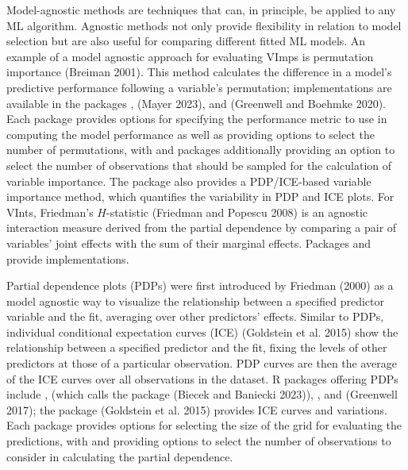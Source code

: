 Model-agnostic methods are techniques that can, in principle, be applied
to any ML algorithm. Agnostic methods not only provide flexibility in
relation to model selection but are also useful for comparing different
fitted ML models. An example of a model agnostic approach for evaluating
VImps is permutation importance (Breiman 2001). This method
calculates the difference in a model's predictive performance following
a variable's permutation; implementations are available in the packages ,  (Mayer 2023),  and  (Greenwell and Boehmke 2020). Each package provides options for specifying the performance metric to use in computing the model performance as well as providing options to select the number of permutations, with  and  packages additionally providing an option to select the number of observations that should be sampled for the calculation of variable importance. The  package also provides a PDP/ICE-based variable importance method, which quantifies the variability in PDP and ICE plots. For VInts, Friedman's \(H\)-statistic (Friedman and Popescu 2008) is an agnostic interaction measure derived from the partial dependence by comparing a pair of variables' joint effects with the sum of their marginal
effects. Packages  and  provide implementations.

Partial dependence plots (PDPs) were first introduced by Friedman (2000) as
a model agnostic way to visualize the relationship between a specified
predictor variable and the fit, averaging over other predictors'
effects. Similar to PDPs, individual conditional expectation curves (ICE)
(Goldstein et al. 2015) show the relationship between a specified predictor and the
fit, fixing the levels of other predictors at those of a particular
observation. PDP curves are then the average of the ICE curves over all
observations in the dataset. R packages offering PDPs include
,  (which calls the  package (Biecek and Baniecki 2023)), , and  (Greenwell 2017);
the package  (Goldstein et al. 2015) provides ICE curves and variations. Each package provides options for selecting the size of the grid for evaluating the predictions, with  and  providing options to select the number of observations to consider in calculating the partial dependence.

